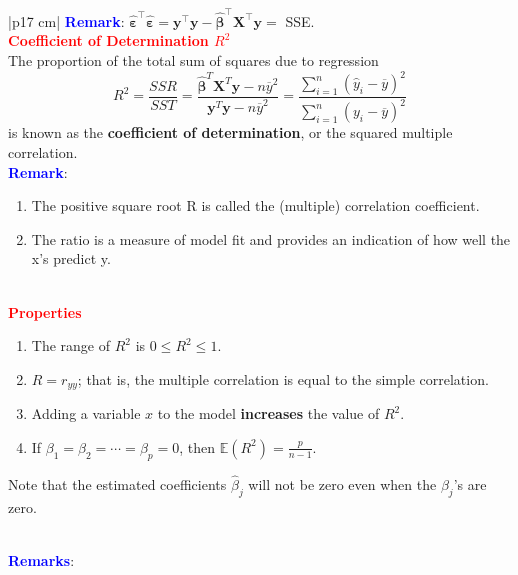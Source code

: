 \documentclass[a4paper,11pt]{article}
\begin{document}
\begin{longtable}{|p{17 cm}|}
\textbf{\textcolor{blue}{Remark}}: 
$\boldsymbol{\hat{\varepsilon}}^\top \boldsymbol{\hat{\varepsilon}} 
= \mathbf{y}^\top \mathbf{y} - \hat{\boldsymbol{\beta}}^\top \mathbf{X}^\top \mathbf{y} 
= $ SSE.\\
\hline
\textcolor{red}{\textbf{Coefficient of Determination $R^2$}} \\ 
The proportion of the total sum of squares due to regression
\[
R^2 = \frac{SSR}{SST} = \frac{\boldsymbol{\hat{\beta}}^T\textbf{X}^T\textbf{y} - n\overline{y}^2}{\textbf{y}^T\textbf{y} - n\overline{y}^2} = \frac{\sum_{i=1}^n (\hat{y}_i - \overline{y})^2}{\sum_{i=1}^n (y_i - \overline{y})^2}
\]
is known as the \textbf{coefficient of determination}, or the squared multiple correlation. \\
\textbf{\textcolor{blue}{Remark}}: \\
\begin{minipage}{\linewidth} 
\vspace{-0.1cm}
\begin{enumerate}
[noitemsep, topsep=0pt]
    \item The positive square root R is called the (multiple) correlation coefficient.
    \item The ratio is a measure of model fit and provides an indication of how well the x's predict y.
\end{enumerate}
\end{minipage} \\
\hline  
\newpage
\hline
\textcolor{red}{\textbf{Properties}} \\
\begin{minipage}{\linewidth} 
\vspace{-0.1cm}
\begin{enumerate}
[noitemsep, topsep=0pt]
    \item The range of $R^2$ is $0 \leq R^2 \leq 1$.
    \item $R = r_{yy}$; that is, the multiple correlation is equal to the simple correlation.
    \item Adding a variable $x$ to the model \textbf{increases} the value of $R^2$.
    \item If $\beta_1 = \beta_2 = \cdots = \beta_p = 0$, then
    \(
    \mathbb{E}(R^2) = \frac{p}{n-1}.
    \)
\end{enumerate}
Note that the estimated coefficients $\hat{\beta}_j$ will not be zero even when the  $\beta_j$'s are zero.
\end{minipage} \\
\hline
\textbf{\textcolor{blue}{Remarks}}: \\

\end{longtable}
\end{document}

